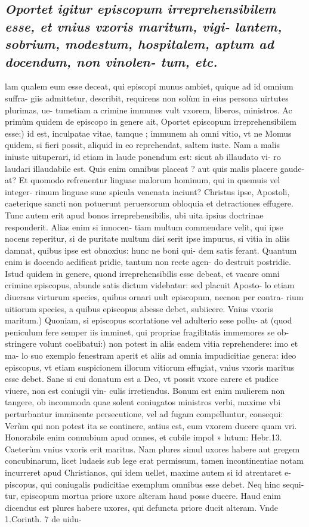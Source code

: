 \documentclass{article}
\begin{document}
\begin{pages}
\subsection*{\textit{Oportet igitur episcopum irreprehensibilem esse, et vnius vxoris maritum, vigi- lantem, sobrium, modestum, hospitalem, aptum ad docendum, non vinolen- tum, etc. }}\pstart lam qualem eum esse deceat, qui episcopi munus ambiet, quique ad id omnium suffra- giis admittetur, describit, requirens non solùm in eius persona uirtutes plurimas, ue- tumetiam a crimine immunes vult vxorem, liberos, ministros. Ac primùm quidem de episcopo in genere ait,  \pend\pstart Oportet episcopum irreprehensibilem esse:) id est, inculpatae vitae, tamque ; immunem ah omni vitio, vt ne Momus quidem, si fieri possit, aliquid in eo reprehendat, saltem iuste. Nam a malis iniuste uituperari, id etiam in laude ponendum est: sicut ab illaudato vi- ro laudari illaudabile est. Quis enim omnibus placeat ? aut quis malis placere gaude- at? Et quomodo refrenentur linguae malorum hominum, qui in quemuis vel integer- rimum linguae suae spicula venenata iaciunt? Christus ipse, Apostoli, caeterique sancti non potuerunt peruersorum obloquia et detractiones effugere. Tunc autem erit apud bonos irreprehensibilis, ubi uita ipsius doctrinae responderit. Alias enim si innocen- tiam multum commendare velit, qui ipse nocens reperitur, si de puritate multum disi serit ipse impurus, si vitia in aliis damnat, quibus ipse est obnoxius: hunc ne boni qui- dem satis ferant. Quantum enim is docendo aedificat pridie, tantum non recte agen- do destruit postridie. Istud quidem in genere, quond irreprehensibilis esse debeat, et vacare omni crimine episcopus, abunde satis dictum videbatur: sed placuit Aposto- lo etiam diuersas virturum species, quibus ornari uult episcopum, necnon per contra- rium uitiorum species, a quibus episcopus abesse debet, subiicere.  \pend\pstart Vnius vxoris maritum.) Quoniam, si episcopus scortatione vel adulterio sese pollu- at (quod peniculum fere semper iis imminet, qui propriae fragilitatis immemores se ob- stringere volunt coelibatui:) non potest in aliis eadem vitia reprehendere: imo et ma- lo suo exemplo fenestram aperit et aliis ad omnia impudicitiae genera: ideo episcopus, vt etiam suspicionem illorum vitiorum effugiat, vnius vxoris maritus esse debet. Sane si cui donatum est a Deo, vt possit vxore carere et pudice viuere, non est coniugii vin- culis irretiendus. Bonum est enim mulierem non tangere, ob incommoda quae solent coniugatos ministros verbi, maxime vbi perturbantur imminente persecutione, vel ad fugam compelluntur, consequi: Verùm qui non potest ita se continere, satius est, eum vxorem ducere quam vri. Honorabile enim connubium apud omnes, et cubile impol » lutum: Hebr.13. Caeterùm vnius vxoris erit maritus. Nam plures simul uxores habere aut gregem concubinarum, licet ludaeis sub lege erat permissum, tamen incontinentiae notam incurreret apud Christianos, qui idem uellet, maxime autem si id atrentaret e- piscopus, qui coniugalis pudicitiae exemplum omnibus esse debet. Neq hinc sequi- tur, episcopum mortua priore uxore alteram haud posse ducere. Haud enim dicendus est plures habere uxores, qui defuncta priore ducit alteram. Vnde 1.Corinth. 7 de uidu- 
\end{pages}
\end{document}

